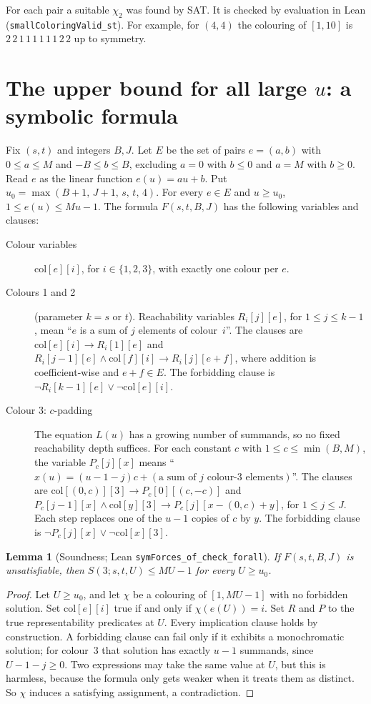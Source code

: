\documentclass[11pt]{amsart}
\newtheorem{lemma}[theorem]{Lemma}
\theoremstyle{definition}
\newcommand{\col}{\mathrm{col}}
\begin{document}
For each pair a suitable $\chi_2$ was found by SAT. It is checked by
evaluation in Lean (\texttt{smallColoringValid\_st}). For example,
for $(4,4)$ the colouring of $[1,10]$ is $2\,2\,1\,1\,1\,1\,1\,1\,2\,2$
up to symmetry.

\section{The upper bound for all large \texorpdfstring{$u$}{u}: a symbolic formula}

Fix $(s,t)$ and integers $B,J$. Let $E$ be the set of pairs
$e=(a,b)$ with $0\le a\le M$ and $-B\le b\le B$, excluding $a=0$ with
$b\le0$ and $a=M$ with $b\ge0$. Read $e$ as the linear function
$e(u)=au+b$. Put $u_0=\max(B+1,\,J+1,\,s,\,t,\,4)$. For every $e\in
E$ and $u\ge u_0$, $1\le e(u)\le Mu-1$. The formula $F(s,t,B,J)$ has
the following variables and clauses:

\begin{description}
\item[Colour variables] $\col[e][i]$, for $i\in\{1,2,3\}$, with
exactly one colour per $e$.

\item[Colours 1 and 2] (parameter $k=s$ or $t$). Reachability
variables $R_i[j][e]$, for $1\le j\le k-1$, mean ``$e$ is a sum of
$j$ elements of colour~$i$''. The clauses are
$\col[e][i]\to R_i[1][e]$ and $R_i[j-1][e]\wedge\col[f][i]\to
R_i[j][e+f]$, where addition is coefficient-wise and $e+f\in E$. The
forbidding clause is $\neg R_i[k-1][e]\vee\neg\col[e][i]$.

\item[Colour 3: $c$-padding] The equation $L(u)$ has a growing
number of summands, so no fixed reachability depth suffices. For each
constant $c$ with $1\le c\le\min(B,M)$, the variable $P_c[j][x]$
means ``$x(u)=(u-1-j)c+(\text{a sum of $j$ colour-3 elements})$''.
The clauses are $\col[(0,c)][3]\to P_c[0][(c,-c)]$ and
$P_c[j-1][x]\wedge\col[y][3]\to P_c[j][x-(0,c)+y]$, for $1\le j\le
J$. Each step replaces one of the $u-1$ copies of $c$ by $y$. The
forbidding clause is $\neg P_c[j][x]\vee\neg\col[x][3]$.
\end{description}

\begin{lemma}[Soundness; Lean \texttt{symForces\_of\_check\_forall}]
\label{lem:sound}
If $F(s,t,B,J)$ is unsatisfiable, then $S(3;s,t,U)\le MU-1$ for every
$U\ge u_0$.
\end{lemma}

\begin{proof}
Let $U\ge u_0$, and let $\chi$ be a colouring of $[1,MU-1]$ with no
forbidden solution. Set $\col[e][i]$ true if and only if
$\chi(e(U))=i$. Set $R$ and $P$ to the true representability
predicates at $U$. Every implication clause holds by construction. A
forbidding clause can fail only if it exhibits a monochromatic
solution; for colour~3 that solution has exactly $u-1$ summands,
since $U-1-j\ge0$. Two expressions may take the same value at $U$,
but this is harmless, because the formula only gets weaker when it
treats them as distinct. So $\chi$ induces a satisfying assignment, a
contradiction.
\end{proof}
\end{document}
